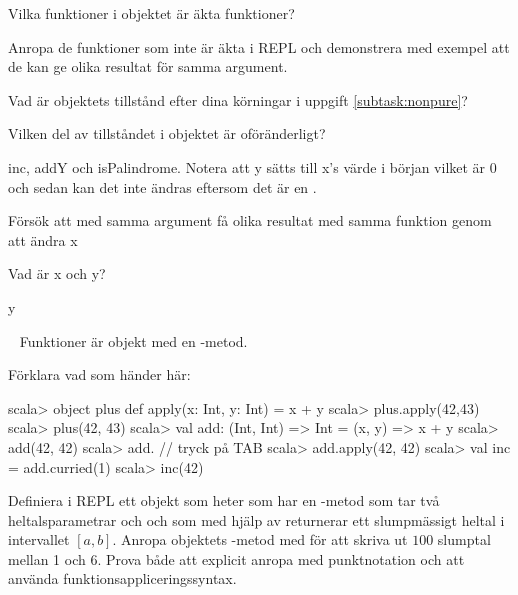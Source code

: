 \Subtask Vilka funktioner i objektet  är äkta funktioner?

\Subtask \label{subtask:nonpure} Anropa de funktioner som inte är äkta i REPL och demonstrera med exempel att de kan ge olika resultat för samma argument.

\Subtask Vad är objektets tillstånd efter dina körningar i uppgift \ref{subtask:nonpure}?

\Subtask Vilken del av tillståndet i objektet är oföränderligt?



\SOLUTION


\TaskSolved \what


\SubtaskSolved  inc, addY och isPalindrome. Notera att y sätts till x's värde i början vilket är 0 och sedan kan det inte ändras eftersom det är en .

\SubtaskSolved  Försök att med samma argument få olika resultat med samma funktion genom att ändra x

\SubtaskSolved  Vad är x och y?

\SubtaskSolved  y



\QUESTEND





\QUESTBEGIN

\Task  \what~ Funktioner är objekt med en -metod.

\Subtask Förklara vad som händer här:
\begin{REPL}
scala> object plus { def apply(x: Int, y: Int) = x + y }
scala> plus.apply(42,43)
scala> plus(42, 43)
scala> val add: (Int, Int) => Int = (x, y) => x + y
scala> add(42, 42)
scala> add.   // tryck på TAB
scala> add.apply(42, 42)
scala> val inc = add.curried(1)
scala> inc(42)
\end{REPL}

\Subtask Definiera i REPL ett objekt som heter  som har en -metod som tar två heltalsparametrar  och  och som med hjälp av  returnerar ett slumpmässigt heltal i intervallet $[a, b]$. Anropa objektets -metod med  för att skriva ut $100$ slumptal mellan 1 och 6. Prova både att explicit anropa  med punktnotation och att använda funktionsappliceringssyntax.



\SOLUTION


